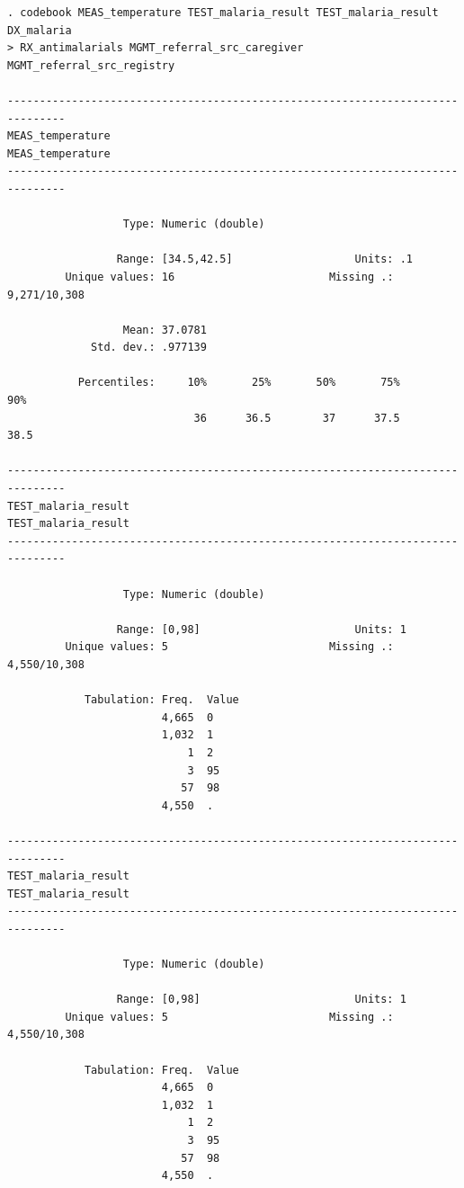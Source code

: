 \documentclass[
  letterpaper,
  DIV=11,
  numbers=noendperiod,
  oneside]{scrreprt}
\begin{document}
\begin{verbatim}
. codebook MEAS_temperature TEST_malaria_result TEST_malaria_result DX_malaria 
> RX_antimalarials MGMT_referral_src_caregiver MGMT_referral_src_registry

-------------------------------------------------------------------------------
MEAS_temperature                                               MEAS_temperature
-------------------------------------------------------------------------------

                  Type: Numeric (double)

                 Range: [34.5,42.5]                   Units: .1
         Unique values: 16                        Missing .: 9,271/10,308

                  Mean: 37.0781
             Std. dev.: .977139

           Percentiles:     10%       25%       50%       75%       90%
                             36      36.5        37      37.5      38.5

-------------------------------------------------------------------------------
TEST_malaria_result                                         TEST_malaria_result
-------------------------------------------------------------------------------

                  Type: Numeric (double)

                 Range: [0,98]                        Units: 1
         Unique values: 5                         Missing .: 4,550/10,308

            Tabulation: Freq.  Value
                        4,665  0
                        1,032  1
                            1  2
                            3  95
                           57  98
                        4,550  .

-------------------------------------------------------------------------------
TEST_malaria_result                                         TEST_malaria_result
-------------------------------------------------------------------------------

                  Type: Numeric (double)

                 Range: [0,98]                        Units: 1
         Unique values: 5                         Missing .: 4,550/10,308

            Tabulation: Freq.  Value
                        4,665  0
                        1,032  1
                            1  2
                            3  95
                           57  98
                        4,550  .


\end{verbatim}
\end{document}
